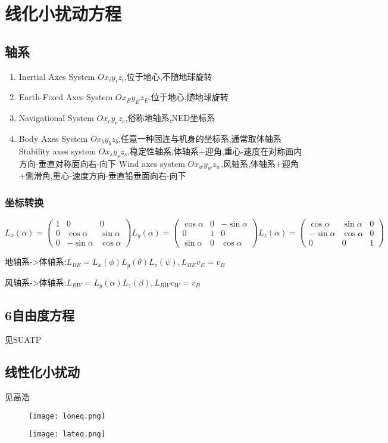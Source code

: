 \chapter{线化小扰动方程}
\section{轴系}
\begin{enumerate}[label=\arabic*.,topsep=0pt]
\setlength{\itemsep}{-2pt}
\item Inertial Axes System $Ox_iy_iz_i$,位于地心,不随地球旋转
\item Earth-Fixed Axes System $Ox_Ey_Ez_E$,位于地心,随地球旋转
\item Navigational System $Ox_ey_ez_e$,俗称地轴系,NED坐标系
\item Body Axes System $Ox_by_bz_b$,任意一种固连与机身的坐标系,通常取体轴系
\subitem Stability axes system $Ox_sy_sz_s$,稳定性轴系,体轴系+迎角,重心-速度在对称面内方向-垂直对称面向右-向下
\subitem Wind axes system $Ox_wy_wz_w$,风轴系,体轴系+迎角+侧滑角,重心-速度方向-垂直铅垂面向右-向下

\end{enumerate}

\subsection{坐标转换}
$$
L_x(\alpha)=
\begin{pmatrix}
1&0&0\\
0&\cos\alpha&\sin\alpha\\
0&-\sin\alpha&\cos\alpha
\end{pmatrix}
L_y(\alpha)=
\begin{pmatrix}
\cos\alpha&0&-\sin\alpha\\
0&1&0\\
\sin\alpha&0&\cos\alpha
\end{pmatrix}
L_z(\alpha)=
\begin{pmatrix}
\cos\alpha&\sin\alpha&0\\
-\sin\alpha&\cos\alpha&0\\
0&0&1
\end{pmatrix}
$$

地轴系->体轴系:$L_{BE}=L_x(\phi)L_y(\theta)L_z(\psi),L_{BE}v_E=v_B$

风轴系->体轴系:$L_{BW}=L_y(\alpha)L_z(\beta),L_{BW}v_W=v_B$

\section{6自由度方程}
见SUATP

\section{线性化小扰动}
见高浩
\begin{figure}[!h]
\centering
\texttt{[image: loneq.png]}
\end{figure}
\begin{figure}[!h]
\centering
\texttt{[image: lateq.png]}
\end{figure}
\endinput